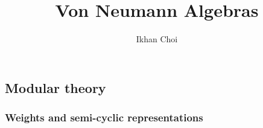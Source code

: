 \documentclass{../../large}
\begin{document}
\title{Von Neumann Algebras}
\author{Ikhan Choi}
\maketitle
\tableofcontents

\iffalse
injectivity
Connes embeddability
property Gamma
Connes' bicentralizer problem
Shlyakhtenko semicircular system
group stability
bimodule
noncommutative probability
\fi


\part{}




\chapter{Modular theory}



\section{Weights and semi-cyclic representations}
\end{document}
